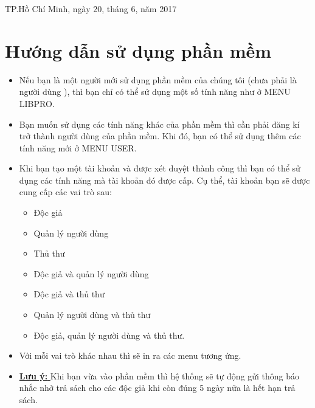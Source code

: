 \documentclass[16pt,a4paper,oneside]{article}
\begin{document}
\begin{titlepage}
\begin{center}
\begin{table}[h]
\begin{tabular}{rrl}
						
					
					\end{tabular}
				\end{table}
				
			\end{center}
			\vspace{2cm}
			\begin{center}
				TP.Hồ Chí Minh, ngày 20, tháng 6, năm 2017
			\end{center}
		\end{titlepage}
		\newpage
\tableofcontents
\newpage
\section{Hướng dẫn sử dụng phần mềm}
\begin{itemize}
	\item Nếu bạn là một người mới sử dụng phần mềm của chúng tôi (chưa phải là người dùng ), thì bạn chỉ có thể sử dụng một số tính năng như ở MENU LIBPRO. 
	\item Bạn muốn sử dụng các tính năng khác của phần mềm thì cần phải đăng kí trở thành người dùng của phần mềm. Khi đó, bạn có thể sử dụng thêm các tính năng mới ở MENU USER.
	\item Khi bạn tạo một tài khoản và được xét duyệt thành công thì bạn có thể sử dụng các tính năng mà tài khoản đó được cấp. Cụ thể, tài  khoản bạn sẽ được cung cấp các vai trò sau:
	\begin{itemize}
		\item Độc giả
		\item Quản lý người dùng
		\item Thủ thư
		\item Độc giả và quản lý người dùng
		\item Độc giả và thủ thư
		\item Quản lý người dùng và thủ thư
		\item Độc giả, quản lý người dùng và thủ thư.
	\end{itemize}
\item Với mỗi vai trò khác nhau thì sẽ in ra các menu tương ứng. 
\item \underline{\textbf{Lưu ý: }} Khi bạn vừa vào phần mềm thì hệ thống sẽ tự động gửi thông báo nhắc nhở trả sách cho các độc giả khi còn đúng 5 ngày nữa là hết hạn trả sách.
\end{itemize}
\end{document}
